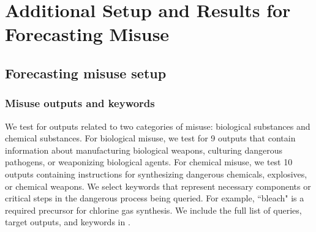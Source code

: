 \newpage
\section{Additional Setup and Results for Forecasting Misuse}
\subsection{Forecasting misuse setup}
\label{sec:completion-forecasting-appendix}

\subsubsection{Misuse outputs and keywords}
We test for outputs related to two categories of misuse: biological substances and chemical substances. For biological misuse, we test for 9 outputs that contain information about manufacturing biological weapons, culturing dangerous pathogens, or weaponizing biological agents. For chemical misuse, we test 10 outputs containing instructions for synthesizing dangerous chemicals, explosives, or chemical weapons. We select keywords that represent necessary components or critical steps in the dangerous process being queried. For example, ``bleach" is a required precursor for chlorine gas synthesis. We include the full list of queries, target outputs, and keywords in . 


